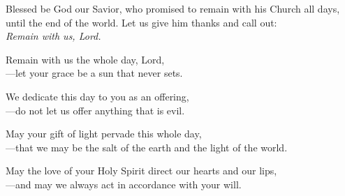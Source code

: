 \intercessions

\begin{raggedright}
Blessed be God our Savior, who promised to remain with his Church all days, until the end of the world. Let us give him thanks and call out:\\
\emph{Remain with us, Lord.}

\medskip
Remain with us the whole day, Lord,\\
{\color{red}---}let your grace be a sun that never sets.

\medskip
We dedicate this day to you as an offering,\\
{\color{red}---}do not let us offer anything that is evil.

\medskip
May your gift of light pervade this whole day,\\
{\color{red}---}that we may be the salt of the earth and the light of the world.

\medskip
May the love of your Holy Spirit direct our hearts and our lips,\\
{\color{red}---}and may we always act in accordance with your will.
\end{raggedright}